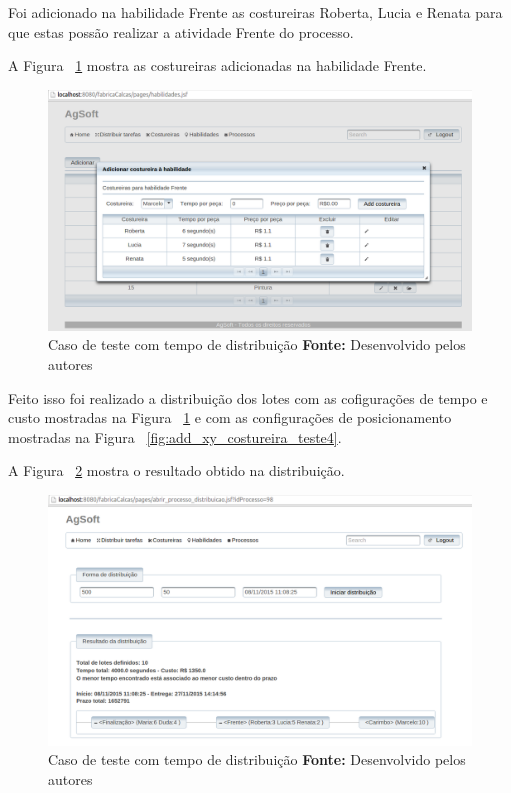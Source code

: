 \par Foi adicionado na habilidade Frente as costureiras Roberta, Lucia e Renata
para que estas possão realizar a atividade Frente do processo.
\par A Figura ~\ref{fig:add_costureira_frente_teste4} mostra as costureiras
adicionadas na habilidade Frente.

\begin{figure}[h!]
	\centerline{\includegraphics[scale=0.3]{./imagens/costureiras_at_frente_tete5.png}}
	\caption[Caso de teste com tempo de distribuição]
	{Caso de teste com tempo de distribuição \textbf{Fonte:} Desenvolvido pelos autores}
	\label{fig:add_costureira_frente_teste4}
\end{figure}

\par Feito isso foi realizado a distribuição dos lotes com as cofigurações de
tempo e custo mostradas na Figura ~\ref{fig:add_costureira_frente_teste4} e com
as configurações de posicionamento mostradas na Figura
~\ref{fig:add_xy_costureira_teste4}.
\par A Figura ~\ref{fig:resultado1_teste5} mostra o resultado obtido na
distribuição.

\newpage

\begin{figure}[h!]
	\centerline{\includegraphics[scale=0.3]{./imagens/resultado1_teste5.png}}
	\caption[Caso de teste com tempo de distribuição]
	{Caso de teste com tempo de distribuição \textbf{Fonte:} Desenvolvido pelos autores}
	\label{fig:resultado1_teste5}
\end{figure}

